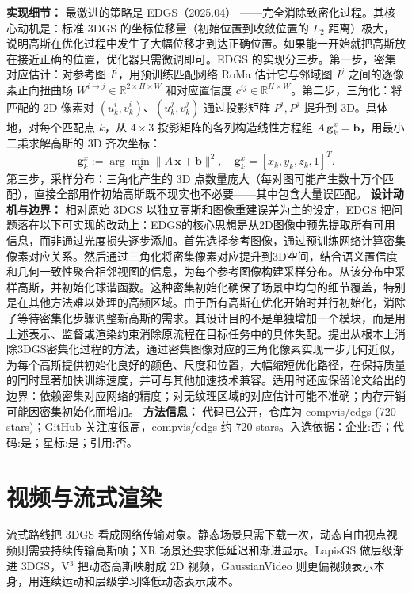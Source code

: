 \textbf{实现细节：} 最激进的策略是 EDGS（2025.04） ——完全消除致密化过程。其核心动机是：标准 3DGS 的坐标位移量（初始位置到收敛位置的 $L_2$ 距离）极大，说明高斯在优化过程中发生了大幅位移才到达正确位置。如果能一开始就把高斯放在接近正确的位置，优化器只需微调即可。EDGS 的实现分三步。第一步，密集对应估计：对参考图 $I^i$，用预训练匹配网络 RoMa 估计它与邻域图 $I^j$ 之间的逐像素正向扭曲场 $W^{i \to j} \in \mathbb{R}^{2 \times H \times W}$ 和对应置信度 $c^{ij} \in \mathbb{R}^{H \times W}$。第二步，三角化：将匹配的 2D 像素对 $(u_k^i, v_k^i)$、$(u_k^j, v_k^j)$ 通过投影矩阵 $P^i, P^j$ 提升到 3D。具体地，对每个匹配点 $k$，从 $4 \times 3$ 投影矩阵的各列构造线性方程组 $A\,\mathbf{g}_k^x = \mathbf{b}$，用最小二乘求解高斯的 3D 齐次坐标： \begin{equation*} \mathbf{g}_k^x := \arg\min_{\mathbf{x}} \|A\,\mathbf{x} + \mathbf{b}\|^2, \quad \mathbf{g}_k^x = [x_k, y_k, z_k, 1]^T. \end{equation*} 第三步，采样分布：三角化产生的 3D 点数量庞大（每对图可能产生数十万个匹配），直接全部用作初始高斯既不现实也不必要——其中包含大量误匹配。
\textbf{设计动机与边界：} 相对原始 3DGS 以独立高斯和图像重建误差为主的设定，EDGS 把问题落在以下可实现的改动上：EDGS的核心思想是从2D图像中预先提取所有可用信息，而非通过光度损失逐步添加。首先选择参考图像，通过预训练网络计算密集像素对应关系。然后通过三角化将密集像素对应提升到3D空间，结合语义置信度和几何一致性聚合相邻视图的信息，为每个参考图像构建采样分布。从该分布中采样高斯，并初始化球谐函数。这种密集初始化确保了场景中均匀的细节覆盖，特别是在其他方法难以处理的高频区域。由于所有高斯在优化开始时并行初始化，消除了等待密集化步骤调整新高斯的需求。其设计目的不是单独增加一个模块，而是用上述表示、监督或渲染约束消除原流程在目标任务中的具体失配。提出从根本上消除3DGS密集化过程的方法，通过密集图像对应的三角化像素实现一步几何近似，为每个高斯提供初始化良好的颜色、尺度和位置，大幅缩短优化路径，在保持质量的同时显著加快训练速度，并可与其他加速技术兼容。适用时还应保留论文给出的边界：依赖密集对应网络的精度；对无纹理区域的对应估计可能不准确；内存开销可能因密集初始化而增加。
\textbf{方法信息：} 代码已公开，仓库为 compvis/edgs (720 stars)；GitHub 关注度很高，compvis/edgs 约 720 stars。入选依据：企业:否；代码:是；星标:是；引用:否。


\section{视频与流式渲染}

流式路线把 3DGS 看成网络传输对象。静态场景只需下载一次，动态自由视点视频则需要持续传输高斯帧；XR 场景还要求低延迟和渐进显示。LapisGS 做层级渐进 3DGS，V$^3$ 把动态高斯映射成 2D 视频，GaussianVideo 则更偏视频表示本身，用连续运动和层级学习降低动态表示成本。


